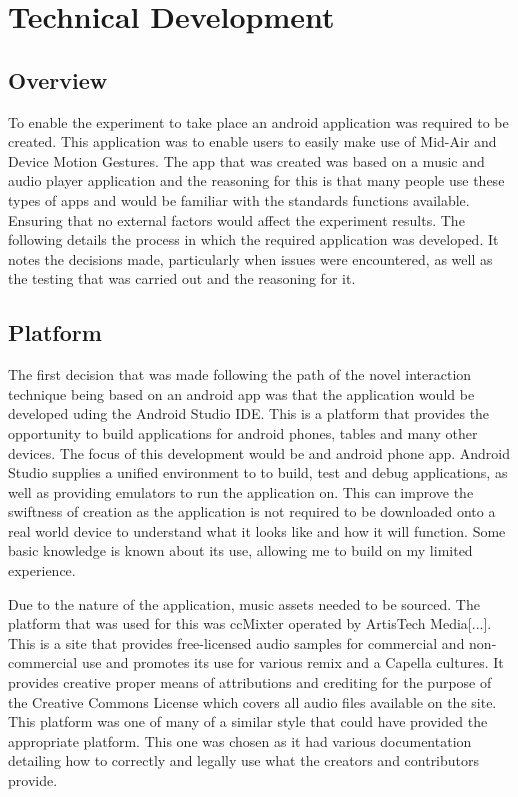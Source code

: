 \documentclass{l4proj}
\begin{document}

\chapter{Technical Development}

\section{Overview}
To enable the experiment to take place an android application was required to be created. This application was to enable users to easily make use of Mid-Air and Device Motion Gestures. The app that was created was based on a music and audio player application and the reasoning for this is that many people use these types of apps and would be familiar with the standards functions available. Ensuring that no external factors would affect the experiment results. The following details the process in which the required application was developed. It notes the decisions made, particularly when issues were encountered, as well as the testing that was carried out and the reasoning for it.

\section{Platform}

The first decision that was made following the path of the novel interaction technique being based on an android app was that the application would be developed uding the Android Studio IDE. This is a platform that provides the opportunity to build applications for android phones, tables and many other devices. The focus of this development would be and android phone app. Android Studio supplies a unified environment to to build, test and debug applications, as well as providing emulators to run the application on. This can improve the swiftness of creation as the application is not required to be downloaded onto a real world device to understand what it looks like and how it will function. Some basic knowledge is known about its use, allowing me to build on my limited experience.

Due to the nature of the application, music assets needed to be sourced. The platform that was used for this was ccMixter operated by ArtisTech Media[...]. This is a site that provides free-licensed audio samples for commercial and non-commercial use and promotes its use for various remix and a Capella cultures. It provides creative proper means of attributions and crediting for the purpose of the Creative Commons License which covers all audio files available on the site. This platform was one of many of a similar style that could have provided the appropriate platform. This one was chosen as it had various documentation detailing how to correctly and legally use what the creators and contributors provide.
\end{document}
